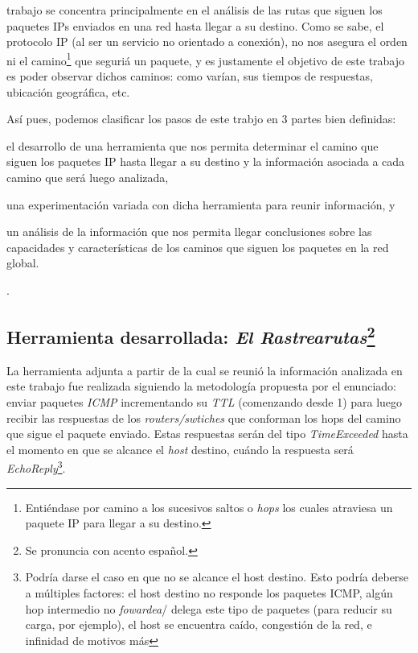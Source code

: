  trabajo se concentra principalmente en el an\'alisis
de las rutas que siguen los paquetes IPs enviados en una red hasta llegar a
su destino. Como se sabe, el protocolo IP (al ser un servicio no orientado
a conexi\'on), no nos asegura el orden ni el camino\footnote{Enti\'endase
por camino a los sucesivos saltos o \textit{hops}\cite{hop} los cuales
atraviesa un paquete IP para llegar a su destino.} que seguri\'a un paquete,
y es justamente el objetivo de este trabajo es poder observar dichos caminos:
como var\'ian, sus tiempos de respuestas, ubicaci\'on geogr\'afica, etc.

\par As\'i pues, podemos clasificar los pasos de este trabjo en 3 partes
bien definidas:
\begin{enumerate*}[label=\itshape\alph*\upshape)]
    \item el desarrollo de una herramienta que nos permita determinar el
        camino que siguen los paquetes IP hasta llegar a su destino y la
        informaci\'on asociada a cada camino que ser\'a luego analizada, 

    \item una experimentaci\'on variada con dicha herramienta para reunir
        informaci\'on, y

    \item un an\'alisis de la informaci\'on que nos permita llegar conclusiones
        sobre las capacidades y caracter\'isticas de los caminos que siguen
        los paquetes en la red global.
\end{enumerate*}.


\subsection*{Herramienta desarrollada: \textit{El Rastrearutas}\footnote{Se
pronuncia con acento espa\~nol.}}\label{sec:traceroute}
\par La herramienta adjunta a partir de la cual se reuni\'o la informaci\'on
analizada en este trabajo fue realizada siguiendo la metodolog\'ia propuesta
por el enunciado: enviar paquetes \textit{ICMP}\cite{rfc792} incrementando
su \textit{TTL} (comenzando desde 1) para luego recibir las respuestas de los
\textit{routers/swtiches} que conforman los hops del camino que sigue el paquete
enviado. Estas respuestas ser\'an del tipo \textit{TimeExceeded} hasta el
momento en que se alcance el \textit{host} destino, cu\'ando la respuesta ser\'a
\textit{EchoReply}\footnote{Podr\'ia darse el caso en que no se alcance el
host destino. Esto podr\'ia deberse a m\'ultiples factores: el host destino
no responde los paquetes ICMP, alg\'un hop intermedio no \textit{fowardea}/%
delega este tipo de paquetes (para reducir su carga, por ejemplo), el host
se encuentra ca\'ido, congesti\'on de la red, e infinidad de motivos m\'as}.

